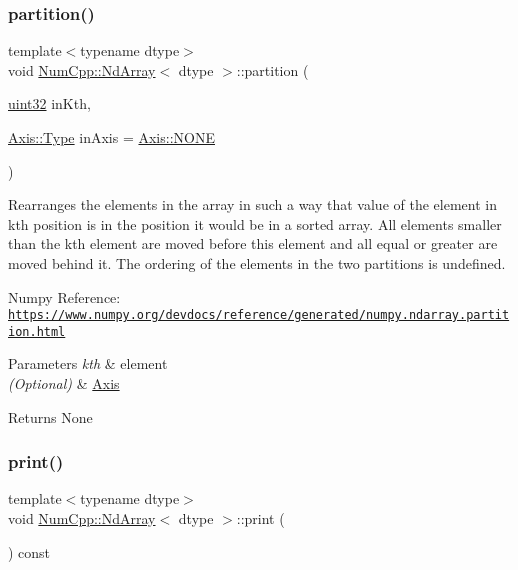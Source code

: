 \subsubsection{\texorpdfstring{partition()}{partition()}}
{\footnotesize\ttfamily template$<$typename dtype$>$ \\
void \mbox{\hyperlink{class_num_cpp_1_1_nd_array}{Num\+Cpp\+::\+Nd\+Array}}$<$ dtype $>$\+::partition (\begin{DoxyParamCaption}\item[{\mbox{\hyperlink{namespace_num_cpp_a36f388e948380413c63011cab9b7fbd5}{uint32}}}]{in\+Kth,  }\item[{\mbox{\hyperlink{struct_num_cpp_1_1_axis_ac10eb76f8631762d9ed70c40c42ca6cb}{Axis\+::\+Type}}}]{in\+Axis = {\ttfamily \mbox{\hyperlink{struct_num_cpp_1_1_axis_ac10eb76f8631762d9ed70c40c42ca6cba747ae657022cca1d87702b56d0c038e9}{Axis\+::\+N\+O\+NE}}} }\end{DoxyParamCaption})\hspace{0.3cm}{\ttfamily [inline]}}

Rearranges the elements in the array in such a way that value of the element in kth position is in the position it would be in a sorted array. All elements smaller than the kth element are moved before this element and all equal or greater are moved behind it. The ordering of the elements in the two partitions is undefined.

Numpy Reference\+: \href{https://www.numpy.org/devdocs/reference/generated/numpy.ndarray.partition.html}{\tt https\+://www.\+numpy.\+org/devdocs/reference/generated/numpy.\+ndarray.\+partition.\+html}


\begin{DoxyParams}{Parameters}
{\em kth} & element \\
\hline
{\em (\+Optional)} & \mbox{\hyperlink{struct_num_cpp_1_1_axis}{Axis}} \\
\hline
\end{DoxyParams}
\begin{DoxyReturn}{Returns}
None 
\end{DoxyReturn}
\mbox{\label{class_num_cpp_1_1_nd_array_aaadbea71587fe5692e7a6ce15dc46158}} 
\subsubsection{\texorpdfstring{print()}{print()}}
{\footnotesize\ttfamily template$<$typename dtype$>$ \\
void \mbox{\hyperlink{class_num_cpp_1_1_nd_array}{Num\+Cpp\+::\+Nd\+Array}}$<$ dtype $>$\+::print (\begin{DoxyParamCaption}{ }\end{DoxyParamCaption}) const\hspace{0.3cm}{\ttfamily [inline]}}

